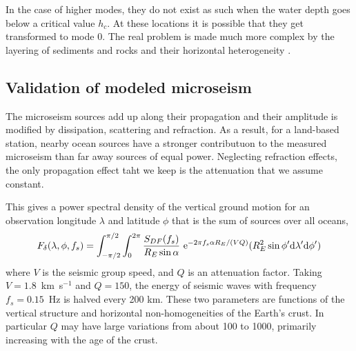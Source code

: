 In the case of higher modes, they do not exist as such when the water depth goes below a critical value $h_c$. 
At these locations it is possible that they get transformed to mode 0.  
The real problem is made much more complex by the layering of sediments and rocks and their horizontal heterogeneity \citep{Gualtieri&al.2015}.

\subsection{Validation of modeled microseism}
The microseism sources add up along their propagation and their amplitude is modified by dissipation, scattering and refraction.  As a result, for a land-based station, nearby ocean sources have a stronger contributuon to the measured microseism than far away sources of equal power. Neglecting refraction effects, the only propagation effect taht we keep is the attenuation that we assume constant. 

This gives a power spectral density of the vertical ground motion for an observation longitude $\lambda$ and latitude $\phi$ that is the sum of sources over all oceans, 
\begin{equation}
F_\delta(\lambda,\phi,f_s)  =  \int_{- \pi/2}^{ \pi/2} \int_0^{2 \pi}\frac{S_{DF}(f_s)}{R_E \sin \alpha} ~ \mathrm{e}^{-2 \pi  f_s \alpha R_E / (V Q)}  (R_E^2 \sin \phi' {\mathrm d} \lambda' 
{\mathrm d} \phi')  \label{F_delta}\nonumber\\\end{equation}
where $V$ is the seismic group speed, and $Q$ is an attenuation factor. 
Taking  $V=1.8$~km~s$^{-1}$ and $Q=150$, the energy of seismic waves with frequency $f_s=0.15$~Hz is halved every 200 km. These two parameters are functions of the vertical structure and horizontal non-homogeneities of the Earth's crust. In particular $Q$ may have large variations from about 100 to 1000, primarily increasing with the age of the crust. 

